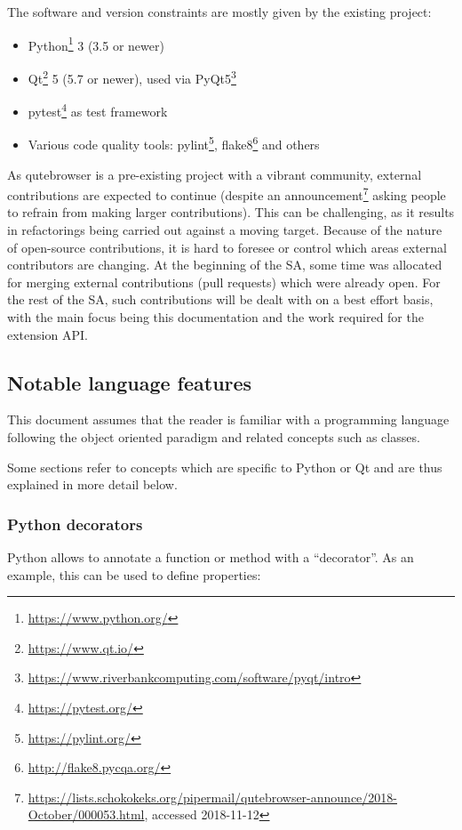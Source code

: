 The software and version constraints are mostly given by the existing project:

\begin{itemize}[parsep=5pt]
  \item Python\footnote{\url{https://www.python.org/}} 3 (3.5 or newer)
  \item Qt\footnote{\url{https://www.qt.io/}} 5 (5.7 or newer), used via PyQt5\footnote{\url{https://www.riverbankcomputing.com/software/pyqt/intro}}
  \item pytest\footnote{\url{https://pytest.org/}} as test framework
  \item Various code quality tools: pylint\footnote{\url{https://pylint.org/}},
    flake8\footnote{\url{http://flake8.pycqa.org/}} and others
\end{itemize}

As qutebrowser is a pre-existing project with a vibrant community, external
contributions are expected to continue (despite an
announcement\footnote{\url{https://lists.schokokeks.org/pipermail/qutebrowser-announce/2018-October/000053.html}, accessed 2018-11-12}
asking people to refrain from making larger contributions). This can be challenging,
as it results in refactorings being carried out against a moving target. Because
of the nature of open-source contributions,
it is hard to foresee or control which areas external contributors are changing.
At the beginning of the SA, some time was allocated for merging external
contributions (pull requests) which were already open. For the rest of the SA,
such contributions will be dealt with on a best effort basis, with the main
focus being this documentation and the work required for the extension API.

\subsection{Notable language features}
\label{sec:langfeatures}
This document assumes that the reader is familiar with a programming language
following the object oriented paradigm and related concepts such as classes.

Some sections refer to concepts which are specific to Python or Qt and are
thus explained in more detail below.

\subsubsection{Python decorators}
Python allows to annotate a function or method with a ``decorator''. As an
example, this can be used to define properties:

